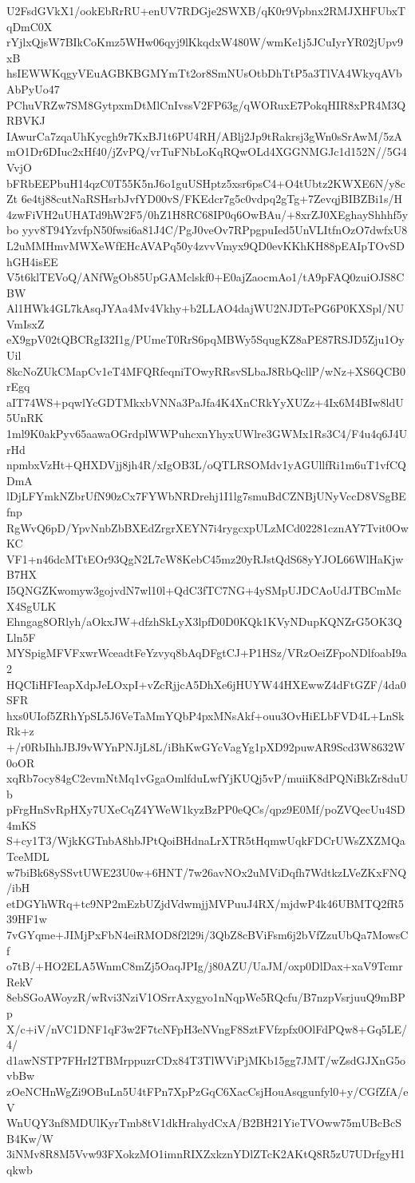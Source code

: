 U2FsdGVkX1/ookEbRrRU+enUV7RDGje2SWXB/qK0r9Vpbnx2RMJXHFUbxTqDmC0X
rYjlxQjsW7BIkCoKmz5WHw06qyj9lKkqdxW480W/wmKe1j5JCuIyrYR02jUpv9xB
hsIEWWKqgyVEuAGBKBGMYmTt2or8SmNUsOtbDhTtP5a3TlVA4WkyqAVbAbPyUo47
PChuVRZw7SM8GytpxmDtMlCnIvssV2FP63g/qWORuxE7PokqHIR8xPR4M3QRBVKJ
IAwurCa7zqaUhKycgh9r7KxBJ1t6PU4RH/ABlj2Jp9tRakrsj3gWn0sSrAwM/5zA
mO1Dr6DIuc2xHf40/jZvPQ/vrTuFNbLoKqRQwOLd4XGGNMGJc1d152N//5G4VvjO
bFRbEEPbuH14qzC0T55K5nJ6o1guUSHptz5xsr6psC4+O4tUbtz2KWXE6N/y8cZt
6e4tj88cutNaRSHsrbJvfYD00vS/FKEdcr7g5c0vdpq2gTg+7ZevqjBIBZBi1s/H
4zwFiVH2uUHATd9hW2F5/0hZ1H8RC68IP0q6OwBAu/+8xrZJ0XEghayShhhf5ybo
yyv8T94YzvfpN50fwsi6a81J4C/PgJ0veOv7RPpgpuIed5UnVLItfnOzO7dwfxU8
L2uMMHmvMWXeWfEHcAVAPq50y4zvvVmyx9QD0evKKhKH88pEAIpTOvSDhGH4isEE
V5t6klTEVoQ/ANfWgOb85UpGAMclskf0+E0ajZaocmAo1/tA9pFAQ0zuiOJS8CBW
Al1HWk4GL7kAsqJYAa4Mv4Vkhy+b2LLAO4dajWU2NJDTePG6P0KXSpl/NUVmIsxZ
eX9gpV02tQBCRgI32I1g/PUmeT0RrS6pqMBWy5SqugKZ8aPE87RSJD5Zju1OyUil
8kcNoZUkCMapCv1eT4MFQRfeqniTOwyRRsvSLbaJ8RbQcllP/wNz+XS6QCB0rEgq
aIT74WS+pqwlYcGDTMkxbVNNa3PaJfa4K4XnCRkYyXUZz+4Ix6M4BIw8ldU5UnRK
1ml9K0akPyv65aawaOGrdplWWPuhcxnYhyxUWlre3GWMx1Rs3C4/F4u4q6J4UrHd
npmbxVzHt+QHXDVjj8jh4R/xIgOB3L/oQTLRSOMdv1yAGUllfRi1m6uT1vfCQDmA
lDjLFYmkNZbrUfN90zCx7FYWbNRDrehj1I1lg7smuBdCZNBjUNyVccD8VSgBEfnp
RgWvQ6pD/YpvNnbZbBXEdZrgrXEYN7i4rygcxpULzMCd02281cznAY7Tvit0OwKC
VF1+n46dcMTtEOr93QgN2L7cW8KebC45mz20yRJstQdS68yYJOL66WlHaKjwB7HX
I5QNGZKwomyw3gojvdN7wl10l+QdC3fTC7NG+4ySMpUJDCAoUdJTBCmMcX4SgULK
Ehngag8ORlyh/aOkxJW+dfzhSkLyX3lpfD0D0KQk1KVyNDupKQNZrG5OK3QLln5F
MYSpigMFVFxwrWceadtFeYzvyq8bAqDFgtCJ+P1HSz/VRzOeiZFpoNDlfoabI9a2
HQCIiHFIeapXdpJeLOxpI+vZcRjjcA5DhXe6jHUYW44HXEwwZ4dFtGZF/4da0SFR
hxs0UIof5ZRhYpSL5J6VeTaMmYQbP4pxMNsAkf+ouu3OvHiELbFVD4L+LnSkRk+z
+/r0RbIhhJBJ9vWYnPNJjL8L/iBhKwGYcVagYg1pXD92puwAR9Scd3W8632W0oOR
xqRb7ocy84gC2evmNtMq1vGgaOmlfduLwfYjKUQj5vP/muiiK8dPQNiBkZr8duUb
pFrgHnSvRpHXy7UXeCqZ4YWeW1kyzBzPP0eQCs/qpz9E0Mf/poZVQecUu4SD4mKS
S+cy1T3/WjkKGTnbA8hbJPtQoiBHdnaLrXTR5tHqmwUqkFDCrUWsZXZMQaTceMDL
w7biBk68ySSvtUWE23U0w+6HNT/7w26avNOx2uMViDqfh7WdtkzLVeZKxFNQ/ibH
etDGYhWRq+tc9NP2mEzbUZjdVdwmjjMVPuuJ4RX/mjdwP4k46UBMTQ2fR539HF1w
7vGYqme+JIMjPxFbN4eiRMOD8f2l29i/3QbZ8cBViFsm6j2bVfZzuUbQa7MowsCf
o7tB/+HO2ELA5WnmC8mZj5OaqJPIg/j80AZU/UaJM/oxp0DlDax+xaV9TcmrRekV
8ebSGoAWoyzR/wRvi3NziV1OSrrAxygyo1nNqpWe5RQcfu/B7nzpVsrjuuQ9mBPp
X/c+iV/nVC1DNF1qF3w2F7tcNFpH3eNVngF8SztFVfzpfx0OlFdPQw8+Gq5LE/4/
d1awNSTP7FHrI2TBMrppuzrCDx84T3TlWViPjMKb15gg7JMT/wZsdGJXnG5ovbBw
zOeNCHnWgZi9OBuLn5U4tFPn7XpPzGqC6XacCsjHouAsqgunfyl0+y/CGfZfA/eV
WnUQY3nf8MDUlKyrTmb8tV1dkHrahydCxA/B2BH21YieTVOww75mUBcBcSB4Kw/W
3iNMv8R8M5Vvw93FXokzMO1imnRIXZxkznYDlZTcK2AKtQ8R5zU7UDrfgyH1qkwb
